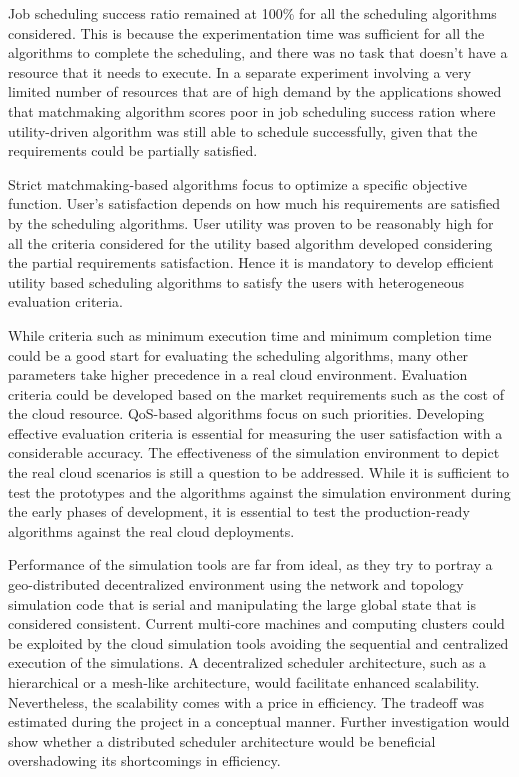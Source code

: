 \documentclass[times, 10pt,twocolumn]{article}
\begin{document}
Job scheduling success ratio remained at 100\% for all the scheduling algorithms considered. This is because the experimentation time was sufficient for all the algorithms to complete the scheduling, and there was no task that doesn't have a resource that it needs to execute. In a separate experiment involving a very limited number of resources that are of high demand by the applications showed that matchmaking algorithm scores poor in job scheduling success ration where utility-driven algorithm was still able to schedule successfully, given that the requirements could be partially satisfied.

Strict matchmaking-based algorithms focus to optimize a specific objective function. User's satisfaction depends on how much his requirements are satisfied by the scheduling algorithms. User utility was proven to be reasonably high for all the criteria considered for the utility based algorithm developed considering the partial requirements satisfaction. Hence it is mandatory to develop efficient utility based scheduling algorithms to satisfy the users with heterogeneous evaluation criteria.

While criteria such as minimum execution time and minimum completion time could be a good start for evaluating the scheduling algorithms, many other parameters take higher precedence in a real cloud environment. Evaluation criteria could be developed based on the market requirements such as the cost of the cloud resource. QoS-based algorithms focus on such priorities. Developing effective evaluation criteria is essential for measuring the user satisfaction with a considerable accuracy. The effectiveness of the simulation environment to depict the real cloud scenarios is still a question to be addressed. While it is sufficient to test the prototypes and the algorithms against the simulation environment during the early phases of development, it is essential to test the production-ready algorithms against the real cloud deployments.

Performance of the simulation tools are far from ideal, as they try to portray a geo-distributed decentralized environment using the network and topology simulation code that is serial and manipulating the large global state that is  considered consistent. Current multi-core machines and computing clusters could be exploited by the cloud simulation tools avoiding the sequential and centralized execution of the simulations. A decentralized scheduler architecture, such as a hierarchical or a mesh-like architecture, would facilitate enhanced scalability. Nevertheless, the scalability comes with a price in efficiency. The tradeoff was estimated during the project in a conceptual manner. Further investigation would show whether a distributed scheduler architecture would be beneficial overshadowing its shortcomings in efficiency.
\end{document}
